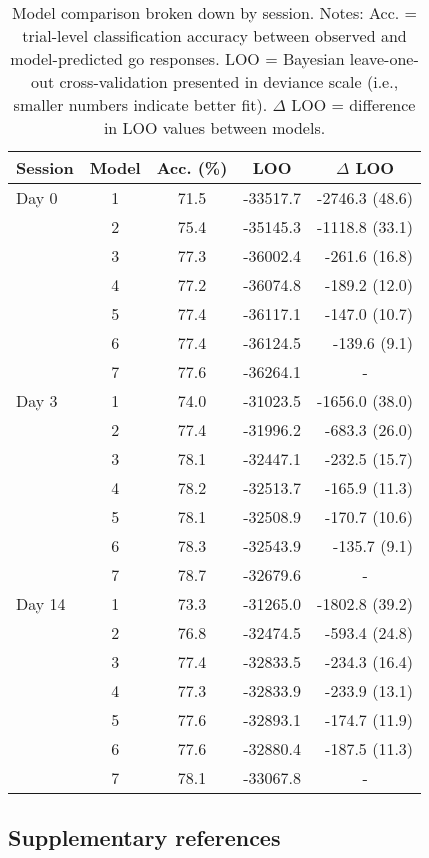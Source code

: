 \documentclass[a4paper,12pt]{article}
\begin{document}
\begin{refsection}[supp]
\begin{table}[h]
    \centering
    \begin{tabular}{lcccr}
        \toprule
        Session & Model & Acc. (\%) & LOO & \multicolumn{1}{c}{$\Delta$ LOO} \\
        \midrule
         Day 0 & 1 & 71.5 & -33517.7 & -2746.3 (48.6) \\
         & 2 & 75.4 & -35145.3 & -1118.8 (33.1) \\
         & 3 & 77.3 & -36002.4 & -261.6 (16.8) \\
         & 4 & 77.2 & -36074.8 & -189.2 (12.0) \\
         & 5 & 77.4 & -36117.1 & -147.0 (10.7) \\
         & 6 & 77.4 & -36124.5 & -139.6 (9.1) \\
         & 7 & 77.6 & -36264.1 & \multicolumn{1}{c}{-} \\
         \midrule
         Day 3 & 1 & 74.0 & -31023.5 & -1656.0 (38.0) \\
         & 2 & 77.4 & -31996.2 & -683.3 (26.0) \\
         & 3 & 78.1 & -32447.1 & -232.5 (15.7) \\
         & 4 & 78.2 & -32513.7 & -165.9 (11.3) \\
         & 5 & 78.1 & -32508.9 & -170.7 (10.6) \\
         & 6 & 78.3 & -32543.9 & -135.7 (9.1) \\
         & 7 & 78.7 & -32679.6 & \multicolumn{1}{c}{-} \\
         \midrule
         Day 14 & 1 & 73.3 & -31265.0 & -1802.8 (39.2) \\
         & 2 & 76.8 & -32474.5 & -593.4 (24.8) \\
         & 3 & 77.4 & -32833.5 & -234.3 (16.4) \\
         & 4 & 77.3 & -32833.9 & -233.9 (13.1) \\
         & 5 & 77.6 & -32893.1 & -174.7 (11.9) \\
         & 6 & 77.6 & -32880.4 & -187.5 (11.3) \\
         & 7 & 78.1 & -33067.8 & \multicolumn{1}{c}{-} \\
         \bottomrule
    \end{tabular}
    \caption{Model comparison broken down by session. Notes: Acc. = trial-level classification accuracy between observed and model-predicted go responses. LOO = Bayesian leave-one-out cross-validation presented in deviance scale (i.e., smaller numbers indicate better fit). $\Delta$ LOO = difference in LOO values between models.}
    \label{tab:exp2_mc_full}
\end{table}

\break
\subsection*{Supplementary references}
\printbibliography[heading=supp]
\end{refsection}

\end{document}
